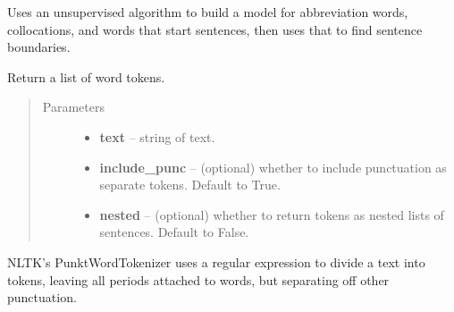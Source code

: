 \documentclass[letterpaper,10pt,english]{sphinxmanual}
\begin{document}
\begin{fulllineitems}
\begin{fulllineitems}
Uses an unsupervised algorithm to build a model for abbreviation
words, collocations, and words that start sentences, then uses
that to find sentence boundaries.

\end{fulllineitems}


\begin{fulllineitems}
\label{api_reference:textblob_de.tokenizers.NLTKPunktTokenizer.tokenize}
Return a list of word tokens.
\begin{quote}\begin{description}
\item[{Parameters}] \leavevmode\begin{itemize}
\item {} 
\textbf{text} -- string of text.

\item {} 
\textbf{include\_punc} -- (optional) whether to include punctuation as separate
tokens. Default to True.

\item {} 
\textbf{nested} -- (optional) whether to return tokens as nested lists of
sentences. Default to False.

\end{itemize}

\end{description}\end{quote}

\end{fulllineitems}


\begin{fulllineitems}
\label{api_reference:textblob_de.tokenizers.NLTKPunktTokenizer.word_tokenize}
NLTK's PunktWordTokenizer uses a regular expression to divide a text
into tokens, leaving all periods attached to words, but separating off
other punctuation.

\end{fulllineitems}


\end{fulllineitems}

\end{document}
